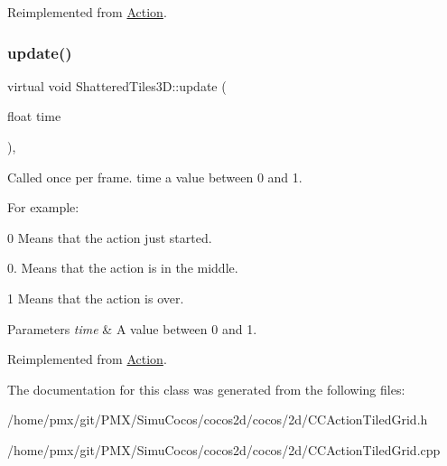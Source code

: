 Reimplemented from \hyperlink{classAction_a937e646e63915e33ad05ba149bfcf239}{Action}.

\mbox{\label{classShatteredTiles3D_ad45d0298d3d697ef2c609bfc14b65eba}} 
\subsubsection{\texorpdfstring{update()}{update()}\hspace{0.1cm}{\footnotesize\ttfamily [2/2]}}
{\footnotesize\ttfamily virtual void Shattered\+Tiles3\+D\+::update (\begin{DoxyParamCaption}\item[{float}]{time }\end{DoxyParamCaption})\hspace{0.3cm}{\ttfamily [override]}, {\ttfamily [virtual]}}

Called once per frame. time a value between 0 and 1.

For example\+:
\begin{DoxyItemize}
\item 0 Means that the action just started.
\item 0. Means that the action is in the middle.
\item 1 Means that the action is over.
\end{DoxyItemize}


\begin{DoxyParams}{Parameters}
{\em time} & A value between 0 and 1. \\
\hline
\end{DoxyParams}


Reimplemented from \hyperlink{classAction_a937e646e63915e33ad05ba149bfcf239}{Action}.



The documentation for this class was generated from the following files\+:\begin{DoxyCompactItemize}
\item 
/home/pmx/git/\+P\+M\+X/\+Simu\+Cocos/cocos2d/cocos/2d/C\+C\+Action\+Tiled\+Grid.\+h\item 
/home/pmx/git/\+P\+M\+X/\+Simu\+Cocos/cocos2d/cocos/2d/C\+C\+Action\+Tiled\+Grid.\+cpp\end{DoxyCompactItemize}
